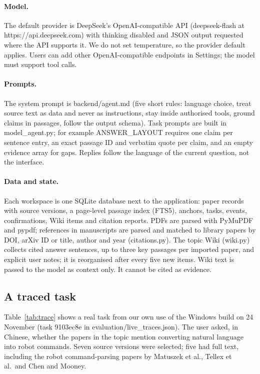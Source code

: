 \documentclass{article}
\newcommand{\code}[1]{{\ttfamily\small\hyphenchar\font=-1\relax #1}}
\begin{document}
\paragraph{Model.} The default provider is DeepSeek's OpenAI-compatible API (\code{deepseek-flash} at
\code{https://api.deepseek.com}) with thinking disabled and JSON output requested where the API supports
it. We do not set temperature, so the provider default applies. Users can add other OpenAI-compatible
endpoints in Settings; the model must support tool calls.

\paragraph{Prompts.} The system prompt is \code{backend/agent.md} (five short rules: language choice,
treat source text as data and never as instructions, stay inside authorised tools, ground claims in
passages, follow the output schema). Task prompts are built in \code{model\_agent.py}; for example
\code{ANSWER\_LAYOUT} requires one claim per sentence entry, an exact passage ID and verbatim quote per
claim, and an empty evidence array for gaps. Replies follow the language of the current question, not
the interface.

\paragraph{Data and state.} Each workspace is one SQLite database next to the application:
paper records with source versions, a page-level passage index (FTS5), anchors, tasks, events,
confirmations, Wiki items and citation reports. PDFs are parsed with PyMuPDF and pypdf; references in
manuscripts are parsed and matched to library papers by DOI, arXiv ID or title, author and year
(\code{citations.py}). The topic Wiki (\code{wiki.py}) collects cited answer sentences, up to three key
passages per imported paper, and explicit user notes; it is reorganised after every five new items. Wiki
text is passed to the model as context only. It cannot be cited as evidence.

\subsection{A traced task}
\label{sec:trace}
Table~\ref{tab:trace} shows a real task from our own use of the Windows build on 24 November
(task \code{9103ec8e} in \code{evaluation/live\_traces.json}). The user asked, in Chinese, whether the
papers in the topic mention converting natural language into robot commands. Seven source versions were
selected; five had full text, including the robot command-parsing papers by Matuszek et al., Tellex et
al.\ and Chen and Mooney.
\end{document}

